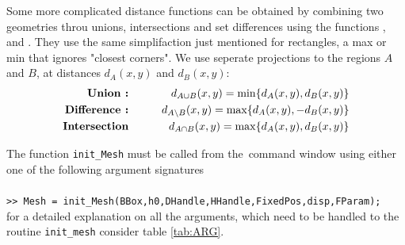  Some more complicated distance functions can be obtained by combining two geometries throu unions, intersections and set differences using the functions ,  and . They use the same simplifaction just mentioned for rectangles, a max or min that ignores "closest corners". We use seperate projections to the regions $A$ and $B$, at distances $d_A(x,y)$ and $d_B(x,y)$:
\begin{eqnarray}
  \text{{\bf Union :}}      & \qquad & d_{A\cup B}(x,y) = \min\{d_A(x,y),d_B(x,y)\} \\
  \text{{\bf Difference :}} & \qquad & d_{A\setminus B}(x,y) = \max\{d_A(x,y),-d_B(x,y)\}\\
  \text{{\bf Intersection}} & \qquad & d_{A\cap B}(x,y) = \max\{d_A(x,y),d_B(x,y)\}
\end{eqnarray}

The function {\tt init\_Mesh} must be called from the \MATLAB\,command window using either one of the following argument
signatures \\

 \\
{\tt >> Mesh = init\_Mesh(BBox,h0,DHandle,HHandle,FixedPos,disp,FParam);} \\

\noindent for a detailed explanation on all the arguments, which need to be handled to the routine {\tt init\_mesh} consider
table \ref{tab:ARG}.

